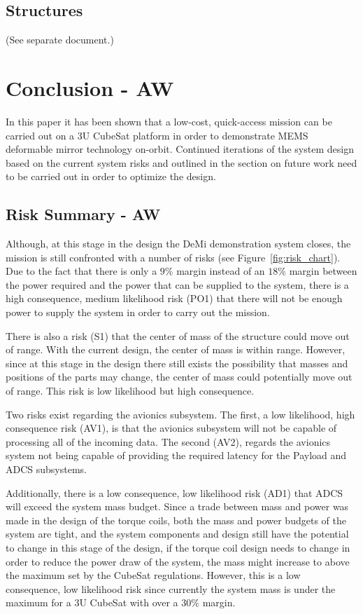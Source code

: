 \documentclass[12pt]{article}
\begin{document}

		\subsection{Structures}

(See separate document.)

\section{Conclusion - AW}

In this paper it has been shown that a low-cost, quick-access mission can be carried out on a 3U CubeSat platform in order to demonstrate MEMS deformable mirror technology on-orbit.  Continued iterations of the system design based on the current system risks and outlined in the section on future work need to be carried out in order to optimize the design.

		\subsection{Risk Summary - AW}

Although, at this stage in the design the DeMi demonstration system closes, the mission is still confronted with a number of risks (see Figure~\ref{fig:risk_chart}).  Due to the fact that there is only a $9\%$ margin instead of an $18\%$ margin between the power required and the power that can be supplied to the system, there is a high consequence, medium likelihood risk (PO1) that there will not be enough power to supply the system in order to carry out the mission.

There is also a risk (S1) that the center of mass of the structure could move out of range.  With the current design, the center of mass is within range.  However, since at this stage in the design there still exists the possibility that masses and positions of the parts may change, the center of mass could potentially move out of range.  This risk is low likelihood but high consequence.

Two risks exist regarding the avionics subsystem.  The first, a low likelihood, high consequence risk (AV1), is that the avionics subsystem will not be capable of processing all of the incoming data.  The second (AV2), regards the avionics system not being capable of providing the required latency for the Payload and ADCS subsystems. 

Additionally, there is a low consequence, low likelihood risk (AD1) that ADCS will exceed the system mass budget.  Since a trade between mass and power was made in the design of the torque coils, both the mass and power budgets of the system are tight, and the system components and design still have the potential to change in this stage of the design, if the torque coil design needs to change in order to reduce the power draw of the system, the mass might increase to above the maximum set by the CubeSat regulations.  However, this is a low consequence, low likelihood risk since currently the system mass is under the maximum for a 3U CubeSat with over a $30\%$ margin.
\end{document}
